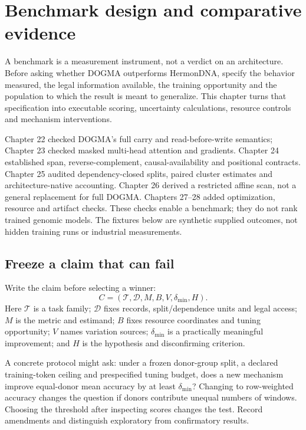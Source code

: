 \chapter{Benchmark design and comparative evidence}
A benchmark is a measurement instrument, not a verdict on an architecture.
Before asking whether DOGMA outperforms HermonDNA, specify the behavior measured,
the legal information available, the training opportunity and the population to
which the result is meant to generalize. This chapter turns that specification
into executable scoring, uncertainty calculations, resource controls and
mechanism interventions.

Chapter 22 checked DOGMA's full carry and read-before-write semantics;
Chapter 23 checked masked multi-head attention and gradients.
Chapter 24 established span, reverse-complement, causal-availability and positional
contracts. Chapter 25 audited dependency-closed splits, paired cluster estimates
and architecture-native accounting. Chapter 26 derived a restricted affine scan,
not a general replacement for full DOGMA. Chapters 27--28 added optimization,
resource and artifact checks. These checks enable a benchmark; they do not rank
trained genomic models. The fixtures below are synthetic supplied outcomes,
not hidden training runs or industrial measurements.

\section{Freeze a claim that can fail}
Write the claim before selecting a winner:
\[
 C=(\mathcal T,\mathcal D,M,B,V,\delta_{\min},H).
\]
Here $\mathcal T$ is a task family; $\mathcal D$ fixes records, split/dependence
units and legal access; $M$ is the metric and estimand; $B$ fixes resource
coordinates and tuning opportunity; $V$ names variation sources;
$\delta_{\min}$ is a practically meaningful improvement; and $H$ is the
hypothesis and disconfirming criterion.

A concrete protocol might ask: under a frozen donor-group split, a declared
training-token ceiling and prespecified tuning budget, does a new mechanism
improve equal-donor mean accuracy by at least $\delta_{\min}$?
Changing to row-weighted accuracy changes the question if donors contribute
unequal numbers of windows. Choosing the threshold after inspecting scores changes
the test. Record amendments and distinguish exploratory from confirmatory results.

